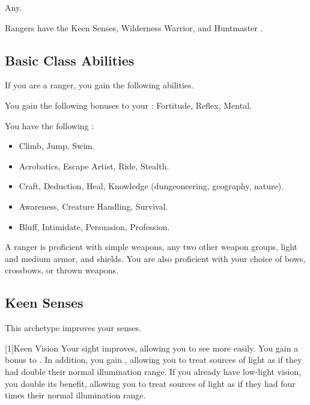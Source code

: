      Any.

     Rangers have the Keen Senses, Wilderness Warrior, and Huntmaster .

    \subsection{Basic Class Abilities}
        If you are a ranger, you gain the following abilities.

        You gain the following bonuses to your :  Fortitude,  Reflex,  Mental.

        You have the following :
        \begin{itemize}
            \item {} Climb, Jump, Swim.
            \item {} Acrobatics, Escape Artist, Ride, Stealth.
            \item {} Craft, Deduction, Heal, Knowledge (dungeoneering, geography, nature).
            \item {} Awareness, Creature Handling, Survival.
            \item {} Bluff, Intimidate, Persuasion, Profession.
        \end{itemize}

        A ranger is proficient with simple weapons, any two other weapon groups, light and medium armor, and shields.
        You are also proficient with your choice of bows, crossbows, or thrown weapons.

    \subsection{Keen Senses}
        This archetype improves your senses.

        [1]{Keen Vision}
        Your sight improves, allowing you to see more easily.
        You gain a  bonus to .
        In addition, you gain , allowing you to treat sources of light as if they had double their normal illumination range.
        If you already have low-light vision, you double its benefit, allowing you to treat sources of light as if they had four times their normal illumination range.

